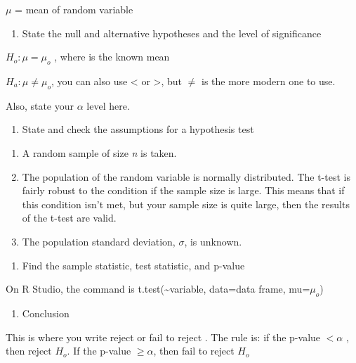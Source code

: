 \documentclass[]{book}
\providecommand{\tightlist}{%
  \setlength{\itemsep}{0pt}\setlength{\parskip}{0pt}}
\begin{document}
\(\mu\) = mean of random variable

\begin{enumerate}
\def\labelenumi{\arabic{enumi}.}
\setcounter{enumi}{1}
\tightlist
\item
  State the null and alternative hypotheses and the level of
  significance
\end{enumerate}

\(H_o:\mu=\mu_o\) , where is the known mean

\(H_a:\mu\ne\mu_o\), you can also use \textless{} or \textgreater{}, but \(\ne\) is the more modern one to use.

Also, state your \(\alpha\) level here.

\begin{enumerate}
\def\labelenumi{\arabic{enumi}.}
\setcounter{enumi}{2}
\tightlist
\item
  State and check the assumptions for a hypothesis test
\end{enumerate}

\begin{enumerate}
\def\labelenumi{\alph{enumi}.}
\item
  A random sample of size \emph{n} is taken.
\item
  The population of the random variable is normally distributed. The t-test is fairly robust to the condition if the sample size is large. This means that if this condition isn't met, but your sample size is quite large, then the results of the t-test are valid.
\item
  The population standard deviation, \(\sigma\), is unknown.
\end{enumerate}

\begin{enumerate}
\def\labelenumi{\arabic{enumi}.}
\setcounter{enumi}{3}
\tightlist
\item
  Find the sample statistic, test statistic, and p-value
\end{enumerate}

On R Studio, the command is t.test(\textasciitilde{}variable, data=data frame, mu=\(\mu_o\))

\begin{enumerate}
\def\labelenumi{\arabic{enumi}.}
\setcounter{enumi}{4}
\tightlist
\item
  Conclusion
\end{enumerate}

This is where you write reject or fail to reject . The rule is: if the p-value \(<\alpha\) , then reject \(H_o\). If the p-value \(\ge \alpha\), then fail to reject \(H_o\)
\end{document}
